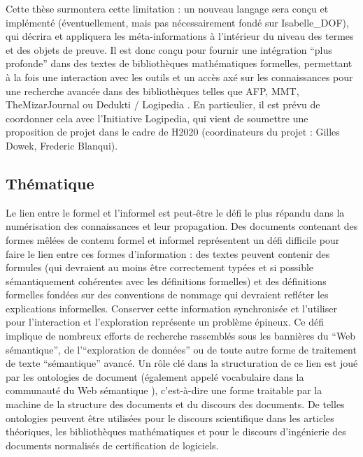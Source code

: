\documentclass[a4paper,10pt]{article}
\begin{document}
Cette thèse surmontera cette limitation :
un nouveau langage sera conçu et implémenté
(éventuellement, mais pas nécessairement fondé sur Isabelle\_DOF),
qui décrira et appliquera les méta-informations
à l'intérieur du niveau des termes et des objets de preuve.
Il est donc conçu pour fournir une intégration \enquote{plus profonde}
dans des textes de bibliothèques mathématiques formelles,
permettant à la fois une interaction avec les outils
et un accès axé sur les connaissances
pour une recherche avancée dans des bibliothèques
telles que AFP, MMT, TheMizarJournal ou Dedukti / Logipedia
\cite {afp,mmt,TheMizarJournal,dedukti}.
En particulier, il est prévu de coordonner cela
avec l'Initiative Logipedia,
qui vient de soumettre une proposition de projet dans le cadre de H2020
(coordinateurs du projet : Gilles Dowek, Frederic Blanqui).

\subsection*{Thématique}

Le lien entre le formel et l'informel est peut-être
le défi le plus répandu dans la numérisation des connaissances
et leur propagation.
Des documents contenant
des formes mêlées de contenu formel et informel représentent
un défi difficile pour faire le lien entre ces formes d'information :
des textes peuvent contenir des formules
(qui devraient au moins être correctement typées
et si possible sémantiquement cohérentes avec les définitions formelles)
et des définitions formelles fondées sur des conventions de nommage
qui devraient refléter les explications informelles.
Conserver cette information synchronisée
et l'utiliser pour l'interaction et l'exploration représente
un problème épineux.
Ce défi implique de nombreux efforts de recherche
rassemblés sous les bannières du \enquote{Web sémantique},
de l'\enquote{exploration de données}
ou de toute autre forme de traitement de texte \enquote{sémantique} avancé.
Un rôle clé dans la structuration de ce lien est joué
par les ontologies de document
(également appelé vocabulaire dans la communauté du Web sémantique
\cite{owlgred}),
c'est-à-dire une forme traitable par la machine de la structure des documents
et du discours des documents.
De telles ontologies peuvent être utilisées
pour le discours scientifique dans les articles théoriques,
les bibliothèques mathématiques
et pour le discours d'ingénierie des documents normalisés
de certification de logiciels.
\end{document}
